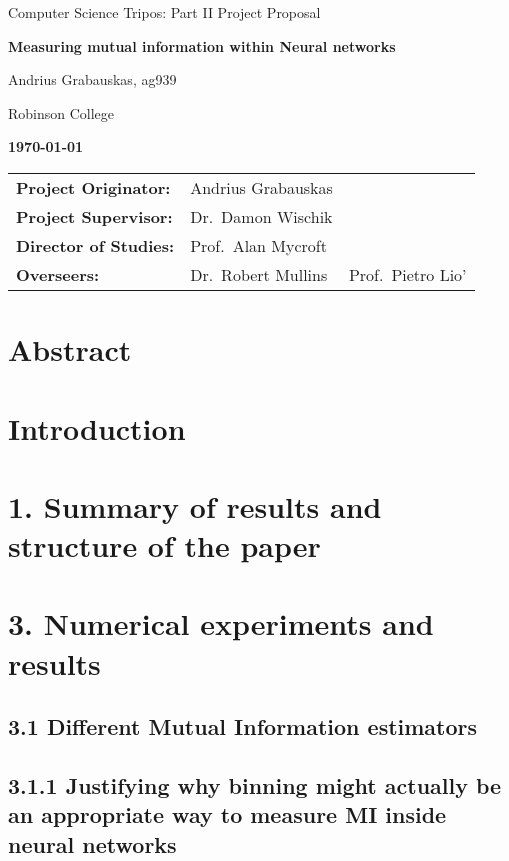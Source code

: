 \documentclass[12pt]{article}
\begin{document}
\centerline{\large Computer Science Tripos: Part II Project Proposal}
\vspace{0.4in}
\centerline{\Large\bf Measuring mutual information within Neural networks}
\vspace{0.3in}

\centerline{Andrius Grabauskas, ag939}
\centerline{Robinson College}

\centerline{\large \textbf{\today}}

\vspace{1in}

\begin{tabular}{ p{4cm} p{4.5cm} l }
{\bf Project Originator:} & Andrius Grabauskas & \\[3mm]
{\bf Project Supervisor:} & Dr.\ Damon Wischik \\[3mm]
{\bf Director of Studies:} & Prof.\ Alan Mycroft \\[3mm]
{\bf Overseers:} & Dr.\ Robert Mullins & Prof.\ Pietro Lio' \\[3mm]
\end{tabular}

\vspace{0.75in}

\section*{Abstract}

\section*{Introduction}

\section*{1. Summary of results and structure of the paper}

\section*{3. Numerical experiments and results}

\subsection*{3.1 Different Mutual Information estimators}

\subsection*{3.1.1 Justifying why binning might actually be an appropriate way to
measure MI inside neural networks}
\end{document}

